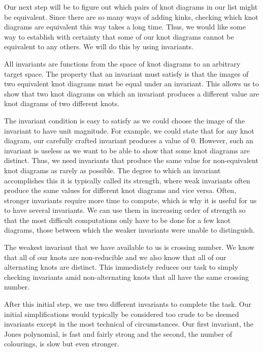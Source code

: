 \begin{paper}
Our next step will be to figure out which pairs of knot diagrams in our list
might be equivalent.
Since there are so many ways of adding kinks, checking which knot diagrams are
equivalent this way takes a long time.
Thus, we would like some way to establish with certainty that some of our knot
diagrams cannot be equivalent to any others.
We will do this by using invariants.


All invariants are functions from the space of knot diagrams to an arbitrary
target space.
The property that an invariant must satisfy is that the images of two equivalent
knot diagrams must be equal under an invariant.
This allows us to show that two knot diagrams on which an invariant produces a
different value are knot diagrams of two different knots.

The invariant condition is easy to satisfy as we could choose the image of the
invariant to have unit magnitude.
For example, we could state that for any knot diagram, our carefully crafted
invariant produces a value of 0.
However, such an invariant is useless as we want to be able to show that some
knot diagrams are distinct.
Thus, we need invariants that produce the same value for non-equivalent knot
diagrams as rarely as possible.
The degree to which an invariant accomplishes this it is typically called its
strength, where weak invariants often produce the same values for different knot
diagrams and vice versa.
Often, stronger invariants require more time to compute, which is why it is
useful for us to have several invariants.
We can use them in increasing order of strength so that the most difficult
computations only have to be done for a few knot diagrams, those between which
the weaker invariants were unable to distinguish.

The weakest invariant that we have available to us is crossing number.
We know that all of our knots are non-reducible and we also know that all of our
alternating knots are distinct.
This immediately reduces our task to simply checking invariants amid
non-alternating knots that all have the same crossing number.

After this initial step, we use two different invariants to complete the task.
Our initial simplifications would typically be considered too crude to be deemed
invariants except in the most technical of circumstances.
Our first invariant, the Jones polynomial, is fast and fairly strong and the
second, the number of colourings, is slow but even stronger.


\end{paper}
